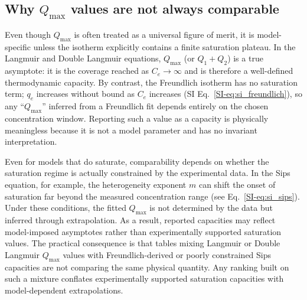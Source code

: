 \documentclass[journal=jacsat,manuscript=article]{achemso}
\begin{document}
	

\subsection{Why $Q_{\max}$ values are not always comparable}
\label{sec:qmax_problem}


Even though $Q_{\max}$ is often treated as a universal figure of merit, it is
model-specific unless the isotherm explicitly contains a finite saturation
plateau. In the Langmuir and Double Langmuir equations, $Q_{\max}$ (or
$Q_1 + Q_2$) is a true asymptote: it is the coverage reached as $C_e \to \infty$
and is therefore a well-defined thermodynamic capacity. By contrast, the
Freundlich isotherm has no saturation term; $q_e$ increases without bound as
$C_e$ increases (SI Eq.~\eqref{SI-eq:si_freundlich}), so any ``$Q_{\max}$''
inferred from a Freundlich fit depends
entirely on the chosen concentration window. Reporting such a value as a
capacity is physically meaningless because it is not a model parameter and has
no invariant interpretation.


Even for models that do saturate, comparability depends on whether the saturation regime is actually constrained by the experimental data. In the Sips equation, for example, the heterogeneity exponent $m$ can shift the onset of saturation far beyond the measured concentration range (see Eq.~\ref{SI-eq:si_sips}). Under these conditions, the fitted $Q_{\max}$ is not determined by the data but inferred through extrapolation. As a result, reported capacities may reflect model-imposed asymptotes rather than experimentally supported saturation values. The practical consequence is that tables mixing Langmuir or Double Langmuir $Q_{\max}$ values with Freundlich-derived or poorly constrained Sips capacities are not comparing the same physical quantity. Any ranking built on such a mixture conflates experimentally supported saturation capacities with model-dependent extrapolations.
\end{document}
